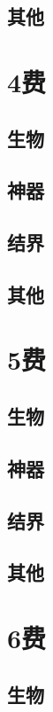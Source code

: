 \documentclass[lang = cn, color = black, 10pt]{AllThatStax}
\begin{document}
\section{其他}

\chapter{4费}

\section{生物}

\section{神器}

\section{结界}

\section{其他}

\chapter{5费}

\section{生物}

\section{神器}

\section{结界}

\section{其他}

\chapter{6费}

\section{生物}
\end{document}
